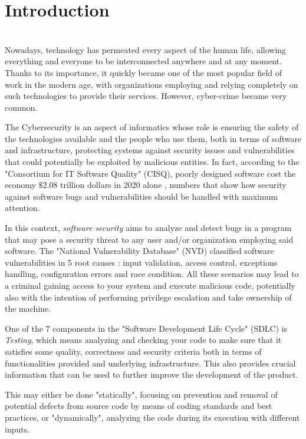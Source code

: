 \chapter{Introduction}
\ \\
Nowadays, technology has permeated every aspect of the human life, allowing everything and everyone to be interconnected anywhere and at any moment. Thanks to its importance, it quickly became one of the most popular field of work in the modern age, with organizations employing and relying completely on such technologies to provide their services. However, cyber-crime became very common. 

The Cybersecurity is an aspect of informatics whose role is ensuring the safety of the technologies available and the people who use them, both in terms of software and infrastructure, protecting systems against security issues and vulnerabilities that could potentially be exploited by malicious entities. In fact, according to the "Consortium for IT Software Quality" (CISQ), poorly designed software cost the economy $\$2.08$ trillion dollars in 2020 alone \cite{forbes}, numbers that show how security against software bugs and vulnerabilities should be handled with maximum attention.

In this context, \textit{software security} aims to analyze and detect bugs in a program that may pose a security threat to any user and/or organization employing said software. The "National Vulnerability Database" (NVD) classified software vulnerabilities in 5 root causes \cite{nist}: input validation, access control, exceptions handling, configuration errors and race condition. All these scenarios may lead to a criminal gaining access to your system and execute malicious code, potentially also with the intention of performing privilege escalation and take ownership of the machine. 

One of the 7 components in the "Software Development Life Cycle" (SDLC) is \textit{Testing}, which means analyzing and checking your code to make sure that it satisfies some quality, correctness and security criteria both in terms of functionalities provided and underlying infrastructure. This also provides crucial information that can be used to further improve the development of the product.  

This may either be done "statically", focusing on prevention and removal of potential defects from source code by means of coding standards and best practices, or "dynamically", analyzing the code during its execution with different inputs.





